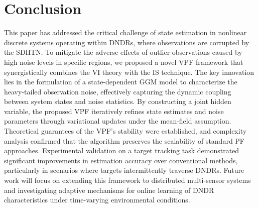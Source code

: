 \documentclass[10pt,twocolumn,twoside]{IEEEtran}
\begin{document}
\section{Conclusion} \label{sec:conclusion}
This paper has addressed the critical challenge of state estimation in nonlinear discrete systems operating within DNDRs, where observations are corrupted by the SDHTN. To mitigate the adverse effects of outlier observations caused by high noise levels in specific regions, we proposed a novel VPF framework that synergistically combines the VI theory with the IS technique. The key innovation lies in the formulation of a state-dependent GGM model to characterize the heavy-tailed observation noise, effectively capturing the dynamic coupling between system states and noise statistics. By constructing a joint hidden variable, the proposed VPF iteratively refines state estimates and noise parameters through variational updates under the mean-field assumption. Theoretical guarantees of the VPF's stability were established, and complexity analysis confirmed that the algorithm preserves the scalability of standard PF approaches. Experimental validation on a target tracking task demonstrated significant improvements in estimation accuracy over conventional methods, particularly in scenarios where targets intermittently traverse DNDRs. Future work will focus on extending this framework to distributed multi-sensor systems and investigating adaptive mechanisms for online learning of DNDR characteristics under time-varying environmental conditions.
\end{document}
